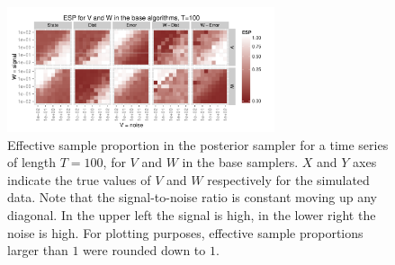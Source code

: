 \documentclass{article}
\begin{document}
\begin{figure}[!ht]
\centering
\includegraphics[width=0.7\textwidth]{baseESplot1}
\caption{Effective sample proportion in the posterior sampler for a time series of length $T=100$, for $V$ and $W$ in the base samplers. $X$ and $Y$ axes indicate the true values of $V$ and $W$ respectively for the simulated data. Note that the signal-to-noise ratio is constant moving up any diagonal. In the upper left the signal is high, in the lower right the noise is high. For plotting purposes, effective sample proportions larger than $1$ were rounded down to $1$.}
\label{baseESplot}
\end{figure}
\end{document}
